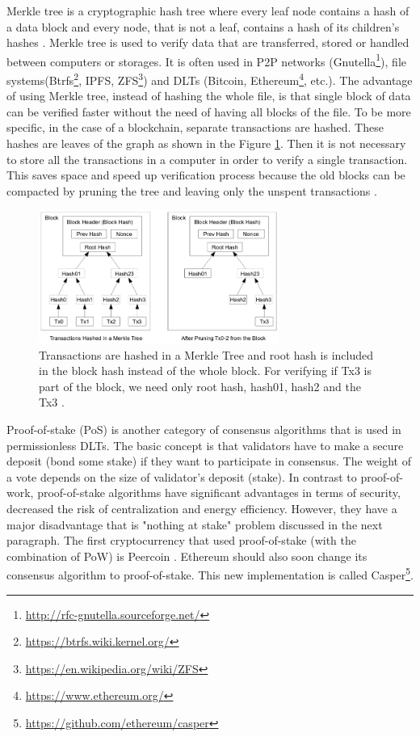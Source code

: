 Merkle tree is a cryptographic hash tree where every leaf node contains a hash of a data block and every node, that is not a leaf, contains a hash of its children's hashes \cite{merkle_protocols_1980}. Merkle tree is used to verify data that are transferred, stored or handled between computers or storages. It is often used in P2P networks (Gnutella\footnote{\url{http://rfc-gnutella.sourceforge.net/}}), file systems(Btrfs\footnote{\url{https://btrfs.wiki.kernel.org/}}, IPFS\cite{labs_ipfs_nodate}, ZFS\footnote{\url{https://en.wikipedia.org/wiki/ZFS}}) and DLTs (Bitcoin\cite{nakamoto_bitcoin:_2008}, Ethereum\footnote{\url{https://www.ethereum.org/}}, etc.). The advantage of using Merkle tree, instead of hashing the whole file, is that single block of data can be verified faster without the need of having all blocks of the file. To be more specific, in the case of a blockchain, separate transactions are hashed. These hashes are leaves of the graph as shown in the Figure \ref{fig:satoshi-merkle-tree}. Then it is not necessary to store all the transactions in a computer in order to verify a single transaction. This saves space and speed up verification process because the old blocks can be compacted by pruning the tree and leaving only the unspent transactions \cite{nakamoto_bitcoin:_2008}.

\begin{figure}[ht]
	\centering
	\includegraphics[width=0.7\textwidth]{images/merkle-tree-satoshi.png}
	\caption{\label{fig:satoshi-merkle-tree}Transactions are hashed in a Merkle Tree and root hash is included in the block hash instead of the whole block. For verifying if Tx3 is part of the block, we need only root hash, hash01, hash2 and the Tx3 \cite{nakamoto_bitcoin:_2008}.}
\end{figure}

Proof-of-stake (PoS) is another category of consensus algorithms that is used in permissionless DLTs. The basic concept is that validators have to make a secure deposit (bond some stake) if they want to participate in consensus. The weight of a vote depends on the size of validator's deposit (stake). In contrast to proof-of-work, proof-of-stake algorithms have significant advantages in terms of security, decreased the risk of centralization and energy efficiency. However, they have a major disadvantage that is "nothing at stake" problem discussed in the next paragraph. The first cryptocurrency that used proof-of-stake (with the combination of PoW) is Peercoin \cite{king_ppcoin:_2012}. Ethereum should also soon change its consensus algorithm to proof-of-stake. This new implementation is called Casper\footnote{\url{https://github.com/ethereum/casper}}.

